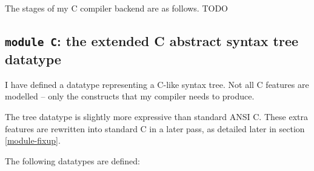\documentclass[12pt,a4paper,twoside,openright]{report}
\begin{document}
The stages of my C compiler backend are as follows. TODO

\subsection{\texttt{module C}: the extended C abstract syntax tree datatype}

I have defined a datatype representing a C-like syntax tree. Not all C features
are modelled -- only the constructs that my compiler needs to produce.

The tree datatype is slightly more expressive than standard ANSI C. These extra
features are rewritten into standard C in a later pass, as detailed later in
section \ref{module-fixup}.

The following datatypes are defined:
\end{document}
